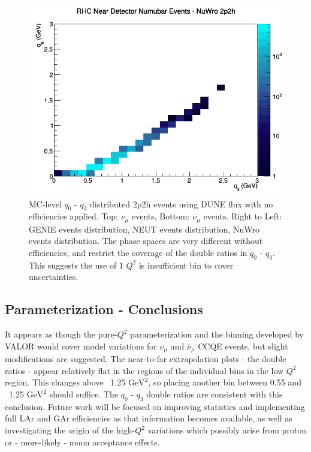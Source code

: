 \documentclass[12pt]{article}
\begin{document}
\begin{figure}[h]
\endminipage
{}
\includegraphics[width=\linewidth]{q0_q3/nominal/2p2h_RHC_ND_numubar_q3_q0_NuWro.png}
\endminipage
\caption{MC-level $q_0 \textrm{ - } q_3$ distributed 2p2h events using DUNE flux with no efficiencies applied. Top: $\nu_{\mu}$ events, Bottom: $\overline{\nu}_{\mu}$ events. Right to Left: GENIE events distribution, NEUT events distribution, NuWro events distribution. The phase spaces are very different without efficiencies, and restrict the coverage of the double ratios in $q_0 \textrm{ - } q_3$. This suggests the use of 1 $Q^2$ is insufficient bin to cover uncertainties.}
\label{fig:q0q3_2p2h_events}
\end{figure}
\FloatBarrier

\subsection{Parameterization - Conclusions}
It appears as though the pure-$Q^2$ parameterization and the binning developed by VALOR would cover model variations for $\nu_{\mu}$ and $\overline{\nu}_{\mu}$ CCQE events, but slight modifications are suggested. The near-to-far extrapolation plots - the double ratios - appear relatively flat in the regions of the individual bins in the low $Q^2$ region. This changes above ~1.25 $\textrm{GeV}^2$, so placing another bin between 0.55 and ~1.25 $\textrm{GeV}^2$ should suffice. The $q_0 \textrm{ - } q_3$ double ratios are consistent with this conclusion. Future work will be focused on improving statistics and implementing full LAr and GAr efficiencies as that information becomes available, as well as investigating the origin of the high-$Q^2$ variations which possibly arise from proton or - more-likely - muon acceptance effects. 
\end{document}
